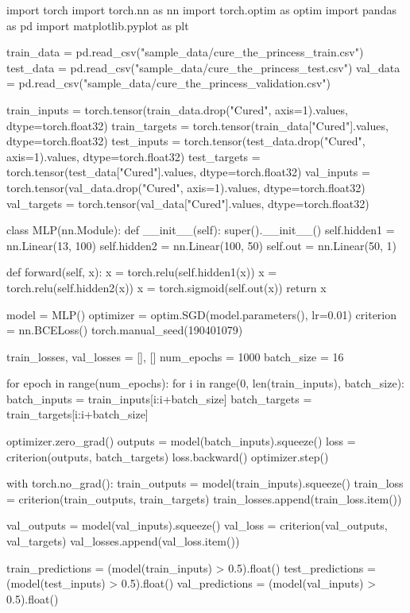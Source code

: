 \documentclass[11pt]{article}
\begin{document}
\begin{python}
import torch
import torch.nn as nn
import torch.optim as optim
import pandas as pd
import matplotlib.pyplot as plt


train_data = pd.read_csv("sample_data/cure_the_princess_train.csv")
test_data = pd.read_csv("sample_data/cure_the_princess_test.csv")
val_data = pd.read_csv("sample_data/cure_the_princess_validation.csv")


train_inputs = torch.tensor(train_data.drop("Cured", axis=1).values, dtype=torch.float32)
train_targets = torch.tensor(train_data["Cured"].values, dtype=torch.float32)
test_inputs = torch.tensor(test_data.drop("Cured", axis=1).values, dtype=torch.float32)
test_targets = torch.tensor(test_data["Cured"].values, dtype=torch.float32)
val_inputs = torch.tensor(val_data.drop("Cured", axis=1).values, dtype=torch.float32)
val_targets = torch.tensor(val_data["Cured"].values, dtype=torch.float32)


class MLP(nn.Module):
    def __init__(self):
        super().__init__()
        self.hidden1 = nn.Linear(13, 100)
        self.hidden2 = nn.Linear(100, 50)
        self.out = nn.Linear(50, 1)

    def forward(self, x):
        x = torch.relu(self.hidden1(x))
        x = torch.relu(self.hidden2(x))
        x = torch.sigmoid(self.out(x))
        return x


model = MLP()
optimizer = optim.SGD(model.parameters(), lr=0.01)
criterion = nn.BCELoss()
torch.manual_seed(190401079)


train_losses, val_losses = [], []
num_epochs = 1000
batch_size = 16

for epoch in range(num_epochs):
    for i in range(0, len(train_inputs), batch_size):
        batch_inputs = train_inputs[i:i+batch_size]
        batch_targets = train_targets[i:i+batch_size]

        optimizer.zero_grad()
        outputs = model(batch_inputs).squeeze()
        loss = criterion(outputs, batch_targets)
        loss.backward()
        optimizer.step()

    
    with torch.no_grad():
        train_outputs = model(train_inputs).squeeze()
        train_loss = criterion(train_outputs, train_targets)
        train_losses.append(train_loss.item())

        val_outputs = model(val_inputs).squeeze()
        val_loss = criterion(val_outputs, val_targets)
        val_losses.append(val_loss.item())

        train_predictions = (model(train_inputs) > 0.5).float()
        test_predictions = (model(test_inputs) > 0.5).float()
        val_predictions = (model(val_inputs) > 0.5).float()


\end{python}
\end{document}
